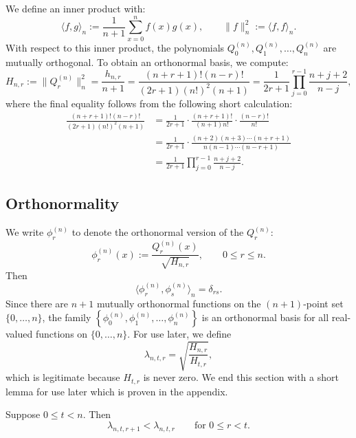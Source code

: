 \documentclass[manuscript,nonacm]{acmart}
\begin{document}
We define an inner product with:
\[
    \langle f,g\rangle_n
    :=
    \frac{1}{n+1}
    \sum_{x=0}^n f(x)g(x),
    \qquad
    \|f\|_n^2:=\langle f,f\rangle_n.
\]
With respect to this inner product, the polynomials $Q_0^{(n)},Q_1^{(n)},\dots,Q_n^{(n)}$ are mutually orthogonal. To obtain an orthonormal basis, we compute:
\begin{equation}
\label{eq:hahn-normalized-norm}
    H_{n,r}
    :=
    \|Q_r^{(n)}\|_n^2
    =
    \frac{h_{n,r}}{n+1}
    =
    \frac{(n+r+1)!(n-r)!}{(2r+1)(n!)^2(n+1)}
    =
    \frac{1}{2r+1}
    \prod_{j=0}^{r-1}
    \frac{n+j+2}{n-j},
\end{equation}
where the final equality follows from the following short calculation:
\begin{align*}
\frac{(n+r+1)!(n-r)!}{(2r+1)(n!)^2(n+1)}
&=
\frac{1}{2r+1}
\cdot
\frac{(n+r+1)!}{(n+1)n!}
\cdot
\frac{(n-r)!}{n!} \\
&=
\frac{1}{2r+1}
\cdot
\frac{(n+2)(n+3)\cdots(n+r+1)}
{n(n-1)\cdots(n-r+1)} \\
&=
\frac{1}{2r+1}
\prod_{j=0}^{r-1}
\frac{n+j+2}{n-j}.
\end{align*}
\subsection{Orthonormality}
We write $\phi_r^{(n)}$ to denote the orthonormal version of the $Q_r^{(n)}$:
\begin{equation}
\label{eq:orthonormal-hahn}
    \phi_r^{(n)}(x)
    :=
    \frac{Q_r^{(n)}(x)}{\sqrt{H_{n,r}}},
    \qquad 0\le r\le n.
\end{equation}
Then
\[
    \langle \phi_r^{(n)},\phi_s^{(n)}\rangle_n
    =
    \delta_{rs}.
\]
Since there are $n+1$ mutually orthonormal functions on the
$(n+1)$-point set $\{0,\dots,n\}$, the family $\left\{
        \phi_0^{(n)},\phi_1^{(n)},\dots,\phi_n^{(n)}
    \right\}$
is an orthonormal basis for all real-valued functions on $\{0,\dots,n\}$.
For use later, we define 
\begin{equation}
\label{eq:lambda-def}
    \lambda_{n,t,r}=\sqrt{\frac{H_{n,r}}{H_{t,r}}},
\end{equation}
which is legitimate because $H_{t,r}$ is never zero. We end this section with a short lemma for use later which is proven in the appendix.
\begin{lemma}
\label{lem:lambda-monotone}
Suppose \(0\le t<n\). Then
\[
    \lambda_{n,t,r+1}<\lambda_{n,t,r}
    \qquad
    \text{for }0\le r<t.
\]
\end{lemma}
\end{document}
